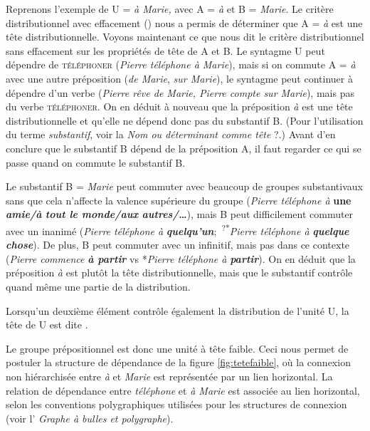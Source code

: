 Reprenons l’exemple de U = \textit{à Marie,} avec A = \textit{à} et B = \textit{Marie}. Le critère distributionnel avec effacement () nous a permis de déterminer que A = \textit{à} est une tête distributionnelle. Voyons maintenant ce que nous dit le critère distributionnel sans effacement sur les propriétés de tête de A et B. Le syntagme U peut dépendre de \textsc{téléphoner} (\textit{Pierre téléphone à Marie}), mais si on commute A = \textit{à} avec une autre préposition (\textit{de Marie}, \textit{sur Marie}), le syntagme peut continuer à dépendre d’un verbe (\textit{Pierre rêve de Marie, Pierre compte sur Marie}), mais pas du verbe \textsc{téléphoner}. On en déduit à nouveau que la préposition \textit{à} est une tête distributionnelle et qu’elle ne dépend donc pas du substantif B. (Pour l’utilisation du terme \textit{substantif}, voir la  \textit{Nom ou déterminant comme tête} ?.) Avant d’en conclure que le substantif B dépend de la préposition A, il faut regarder ce qui se passe quand on commute le substantif B.

Le substantif B = \textit{Marie} peut commuter avec beaucoup de groupes substantivaux sans que cela n’affecte la valence supérieure du groupe (\textit{Pierre téléphone à}\textbf{ \textbf{une} \textit{amie/à} \textit{tout le monde/aux} \textit{autres/…}}), mais B peut difficilement commuter avec un inanimé (\textit{Pierre téléphone à} \textbf{\textit{quelqu’un}};~\textsuperscript{?*}\textit{Pierre téléphone à} \textbf{\textit{quelque chose}}). De plus, B peut commuter avec un infinitif, mais pas dans ce contexte (\textit{Pierre commence} \textbf{\textit{à partir}} vs *\textit{Pierre téléphone à} \textbf{\textit{partir}}). On en déduit que la préposition \textit{à} est plutôt la tête distributionnelle, mais que le substantif contrôle quand même une partie de la distribution.

{Lorsqu’un deuxième élément contrôle également la distribution de l’unité U, la tête de U est dite .}

Le groupe prépositionnel est donc une unité à tête faible. 
Ceci nous permet de postuler la structure de dépendance de la figure \ref{fig:tetefaible}, où la connexion non hiérarchisée entre \textit{à} et \textit{Marie} est représentée par un lien horizontal. La relation de dépendance entre \textit{téléphone} et \textit{à Marie} est associée au lien horizontal, selon les conventions polygraphiques utilisées pour les structures de connexion (voir l’ \textit{Graphe à bulles et polygraphe}). 

